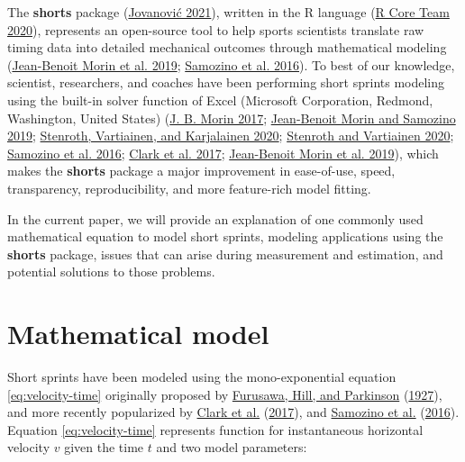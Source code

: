 \documentclass[fleqn,10pt]{wlpeerj} %
\begin{document}
The \textbf{shorts} package (\protect\hyperlink{ref-R-shorts}{Jovanović 2021}), written in the R language (\protect\hyperlink{ref-R-base}{R Core Team 2020}), represents an open-source tool to help sports scientists translate raw timing data into detailed mechanical outcomes through mathematical modeling (\protect\hyperlink{ref-morinSimpleMethodComputing2019}{Jean-Benoit Morin et al. 2019}; \protect\hyperlink{ref-samozinoSimpleMethodMeasuring2016}{Samozino et al. 2016}). To best of our knowledge, scientist, researchers, and coaches have been performing short sprints modeling using the built-in solver function of Excel (Microsoft Corporation, Redmond, Washington, United States) (\protect\hyperlink{ref-morinSpreadsheetSprintAcceleration2017}{J. B. Morin 2017}; \protect\hyperlink{ref-morinSpreadsheetSprintAcceleration2019}{Jean-Benoit Morin and Samozino 2019}; \protect\hyperlink{ref-stenrothForcevelocityProfilingIce2020}{Stenroth, Vartiainen, and Karjalainen 2020}; \protect\hyperlink{ref-stenrothSpreadsheetSprintAcceleration2020}{Stenroth and Vartiainen 2020}; \protect\hyperlink{ref-samozinoSimpleMethodMeasuring2016}{Samozino et al. 2016}; \protect\hyperlink{ref-clarkNFLCombine40Yard2017}{Clark et al. 2017}; \protect\hyperlink{ref-morinSimpleMethodComputing2019}{Jean-Benoit Morin et al. 2019}), which makes the \textbf{shorts} package a major improvement in ease-of-use, speed, transparency, reproducibility, and more feature-rich model fitting.

In the current paper, we will provide an explanation of one commonly used mathematical equation to model short sprints, modeling applications using the \textbf{shorts} package, issues that can arise during measurement and estimation, and potential solutions to those problems.

\hypertarget{mathematical-model}{%
\section{Mathematical model}\label{mathematical-model}}

Short sprints have been modeled using the mono-exponential equation \eqref{eq:velocity-time} originally proposed by \protect\hyperlink{ref-doi:10.1098ux2frspb.1927.0035}{Furusawa, Hill, and Parkinson} (\protect\hyperlink{ref-doi:10.1098ux2frspb.1927.0035}{1927}), and more recently popularized by \protect\hyperlink{ref-clarkNFLCombine40Yard2017}{Clark et al.} (\protect\hyperlink{ref-clarkNFLCombine40Yard2017}{2017}), and \protect\hyperlink{ref-samozinoSimpleMethodMeasuring2016}{Samozino et al.} (\protect\hyperlink{ref-samozinoSimpleMethodMeasuring2016}{2016}). Equation \eqref{eq:velocity-time} represents function for instantaneous horizontal velocity \(v\) given the time \(t\) and two model parameters:
\end{document}
